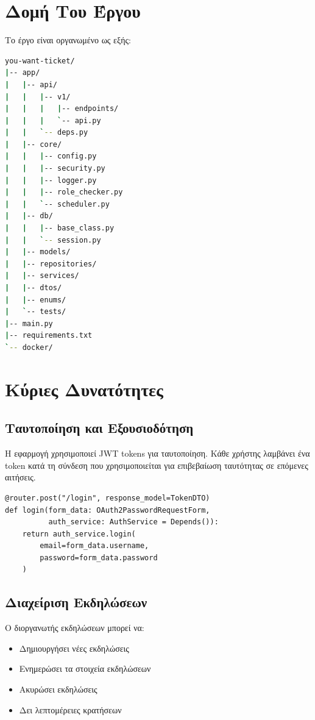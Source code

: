 \documentclass[12pt,a4paper]{report}
\begin{document}
\section{Δομή Του Έργου}

Το έργο είναι οργανωμένο ως εξής:

\begin{lstlisting}[language=bash, caption=Δομή Φακέλου Έργου]
you-want-ticket/
|-- app/
|   |-- api/
|   |   |-- v1/
|   |   |   |-- endpoints/
|   |   |   `-- api.py
|   |   `-- deps.py
|   |-- core/
|   |   |-- config.py
|   |   |-- security.py
|   |   |-- logger.py
|   |   |-- role_checker.py
|   |   `-- scheduler.py
|   |-- db/
|   |   |-- base_class.py
|   |   `-- session.py
|   |-- models/
|   |-- repositories/
|   |-- services/
|   |-- dtos/
|   |-- enums/
|   `-- tests/
|-- main.py
|-- requirements.txt
`-- docker/
\end{lstlisting}

\section{Κύριες Δυνατότητες}

\subsection{Ταυτοποίηση και Εξουσιοδότηση}

Η εφαρμογή χρησιμοποιεί JWT tokens για ταυτοποίηση. Κάθε χρήστης λαμβάνει ένα token κατά τη σύνδεση που χρησιμοποιείται για επιβεβαίωση ταυτότητας σε επόμενες αιτήσεις.

\begin{lstlisting}[caption=Παράδειγμα Login Endpoint]
@router.post("/login", response_model=TokenDTO)
def login(form_data: OAuth2PasswordRequestForm,
          auth_service: AuthService = Depends()):
    return auth_service.login(
        email=form_data.username,
        password=form_data.password
    )
\end{lstlisting}

\subsection{Διαχείριση Εκδηλώσεων}

Ο διοργανωτής εκδηλώσεων μπορεί να:
\begin{itemize}
    \item Δημιουργήσει νέες εκδηλώσεις
    \item Ενημερώσει τα στοιχεία εκδηλώσεων
    \item Ακυρώσει εκδηλώσεις
    \item Δει λεπτομέρειες κρατήσεων
\end{itemize}
\end{document}
